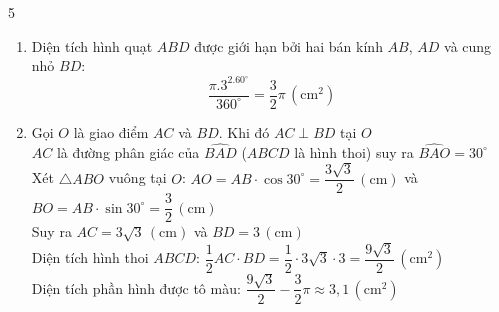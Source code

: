 \begin{Solbook}{5}
 \par \noindent  \begin {enumerate} \item Diện tích hình quạt $ABD$ được giới hạn bởi hai bán kính $AB$, $AD$ và cung nhỏ $BD$: \[\dfrac {\pi .3^2.60 ^{\circ }}{360 ^{\circ }}=\dfrac {3}{2}\pi \,(\text {cm}^2)\] \item Gọi $O$ là giao điểm $AC$ và $BD$. Khi đó $AC\perp BD$ tại $O$\\ $AC$ là đường phân giác của $\widehat {BAD}$ ($ABCD$ là hình thoi) suy ra $\widehat {BAO}=30^{\circ }$\\ Xét $\triangle ABO$ vuông tại $O$: $AO=AB\cdot \cos 30^{\circ }=\dfrac {3\sqrt {3}}{2}\,(\text {cm})$ và $BO=AB\cdot \sin 30^{\circ }=\dfrac {3}{2}\,(\text {cm})$\\ Suy ra $AC=3\sqrt {3}\,(\text {cm})$ và $BD=3\,(\text {cm})$\\ Diện tích hình thoi $ABCD$: $\dfrac {1}{2}AC\cdot BD=\dfrac {1}{2}\cdot 3\sqrt {3}\cdot 3=\dfrac {9\sqrt {3}}{2} \,(\text {cm}^2)$\\ Diện tích phần hình được tô màu: $\dfrac {9\sqrt {3}}{2}-\dfrac {3}{2}\pi \approx 3{,}1 \,(\text {cm}^2)$ \end {enumerate}  \hfill \qedEX 
\end{Solbook}
